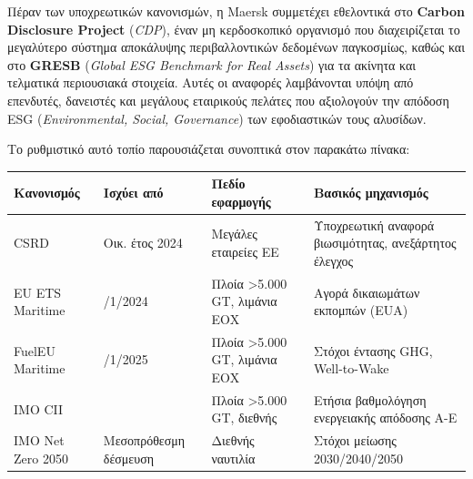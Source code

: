 Πέραν των υποχρεωτικών κανονισμών, η Maersk συμμετέχει εθελοντικά στο
\textbf{Carbon Disclosure Project} (\emph{CDP}), έναν μη κερδοσκοπικό
οργανισμό που διαχειρίζεται το μεγαλύτερο σύστημα αποκάλυψης
περιβαλλοντικών δεδομένων παγκοσμίως, καθώς και στο \textbf{GRESB}
(\emph{Global ESG Benchmark for Real Assets}) για τα ακίνητα και
τελματικά περιουσιακά στοιχεία. Αυτές οι αναφορές λαμβάνονται υπόψη από
επενδυτές, δανειστές και μεγάλους εταιρικούς πελάτες που αξιολογούν την
απόδοση ESG (\emph{Environmental, Social, Governance}) των εφοδιαστικών
τους αλυσίδων.

Το ρυθμιστικό αυτό τοπίο παρουσιάζεται συνοπτικά στον παρακάτω πίνακα:

{\def\LTcaptype{} %
\begin{longtable}[]{@{}
  >{\raggedright\arraybackslash}p{}
  >{\raggedright\arraybackslash}p{}
  >{\raggedright\arraybackslash}p{}
  >{\raggedright\arraybackslash}p{}@{}}
\toprule\noalign{}
\begin{minipage}[b]{\linewidth}\raggedright
Κανονισμός
\end{minipage} & \begin{minipage}[b]{\linewidth}\raggedright
Ισχύει από
\end{minipage} & \begin{minipage}[b]{\linewidth}\raggedright
Πεδίο εφαρμογής
\end{minipage} & \begin{minipage}[b]{\linewidth}\raggedright
Βασικός μηχανισμός
\end{minipage} \\
\midrule\noalign{}
\endhead
\bottomrule\noalign{}
\endlastfoot
CSRD & Οικ. έτος 2024 & Μεγάλες εταιρείες ΕΕ & Υποχρεωτική αναφορά
βιωσιμότητας, ανεξάρτητος έλεγχος \\
EU ETS Maritime & 1/1/2024 & Πλοία \textgreater5.000 GT, λιμάνια ΕΟΧ &
Αγορά δικαιωμάτων εκπομπών (EUA) \\
FuelEU Maritime & 1/1/2025 & Πλοία \textgreater5.000 GT, λιμάνια ΕΟΧ &
Στόχοι έντασης GHG, Well-to-Wake \\
IMO CII & 2023 & Πλοία \textgreater5.000 GT, διεθνής & Ετήσια
βαθμολόγηση ενεργειακής απόδοσης A-E \\
IMO Net Zero 2050 & Μεσοπρόθεσμη δέσμευση & Διεθνής ναυτιλία & Στόχοι
μείωσης 2030/2040/2050 \\
\end{longtable}
}

